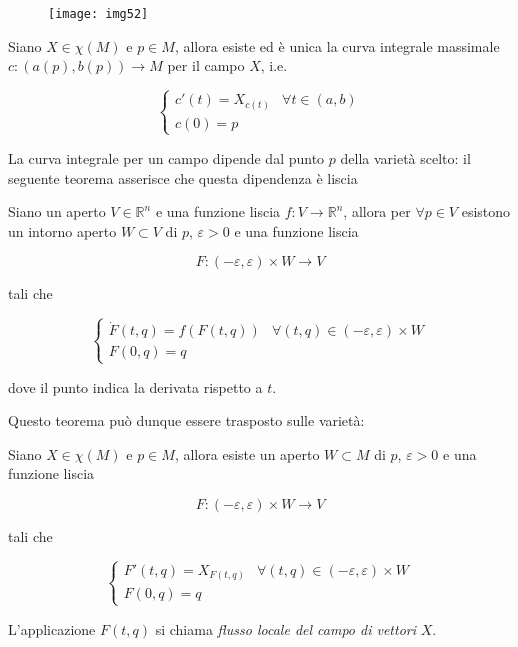 \begin{figure}[H]
	\centering
	\texttt{[image: img52]}
\end{figure}

\begin{theorem}
	Siano $ X \in \chi(M) $ e $ p \in M $, allora esiste ed è unica la curva integrale massimale $ c : (a(p),b(p)) \to M $ per il campo $ X $, i.e.
	
	\begin{equation}
		\begin{cases}
			c'(t) = X_{c(t)} & \forall t \in (a,b)\\
			c(0) = p
		\end{cases}
	\end{equation}
\end{theorem}

La curva integrale per un campo dipende dal punto $ p $ della varietà scelto: il seguente teorema asserisce che questa dipendenza è liscia

\begin{theorem}
	Siano un aperto $ V \in \mathbb{R}^{n} $ e una funzione liscia $ f : V \to \mathbb{R}^{n} $, allora per $ \forall p \in V $ esistono un intorno aperto $ W \subset V $ di $ p $, $ \varepsilon > 0 $ e una funzione liscia
	
	\begin{equation}
		F : (-\varepsilon,\varepsilon) \times W \to V
	\end{equation}

	tali che
	
	\begin{equation}
		\begin{cases}
			\dot{F}(t,q) = f(F(t,q)) & \forall (t,q) \in (-\varepsilon,\varepsilon) \times W\\
			F(0,q) = q
		\end{cases}
	\end{equation}

	dove il punto indica la derivata rispetto a $ t $.
\end{theorem}

Questo teorema può dunque essere trasposto sulle varietà:

\begin{theorem}
	Siano $ X \in \chi(M) $ e $ p \in M $, allora esiste un aperto $ W \subset M $ di $ p $, $ \varepsilon > 0 $ e una funzione liscia
	
	\begin{equation}
		F : (-\varepsilon,\varepsilon) \times W \to V
	\end{equation}

	tali che
	
	\begin{equation}
		\begin{cases}
			F'(t,q) = X_{F(t,q)} & \forall (t,q) \in (-\varepsilon,\varepsilon) \times W\\
			F(0,q) = q
		\end{cases}
	\end{equation}

	L'applicazione $ F(t,q) $ si chiama \textit{flusso locale del campo di vettori} $ X $.
\end{theorem}

